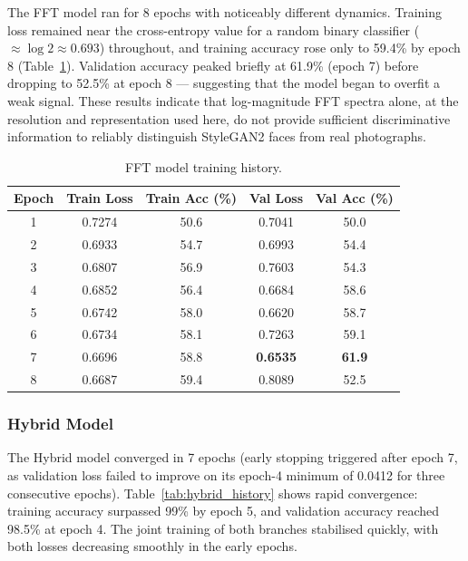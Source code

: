\documentclass[12pt, a4paper]{article}
\begin{document}
The FFT model ran for 8 epochs with noticeably different dynamics.  Training
loss remained near the cross-entropy value for a random binary classifier
($\approx \log 2 \approx 0.693$) throughout, and training accuracy rose only
to 59.4\% by epoch 8 (Table~\ref{tab:fft_history}).  Validation accuracy
peaked briefly at 61.9\% (epoch 7) before dropping to 52.5\% at epoch 8 —
suggesting that the model began to overfit a weak signal.  These results
indicate that log-magnitude FFT spectra alone, at the resolution and
representation used here, do not provide sufficient discriminative information
to reliably distinguish StyleGAN2 faces from real photographs.

\begin{table}[H]
\centering
\caption{FFT model training history.}
\label{tab:fft_history}
\begin{tabular}{ccccc}
\toprule
\textbf{Epoch} & \textbf{Train Loss} & \textbf{Train Acc (\%)} &
\textbf{Val Loss} & \textbf{Val Acc (\%)} \\
\midrule
1 & 0.7274 & 50.6 & 0.7041 & 50.0 \\
2 & 0.6933 & 54.7 & 0.6993 & 54.4 \\
3 & 0.6807 & 56.9 & 0.7603 & 54.3 \\
4 & 0.6852 & 56.4 & 0.6684 & 58.6 \\
5 & 0.6742 & 58.0 & 0.6620 & 58.7 \\
6 & 0.6734 & 58.1 & 0.7263 & 59.1 \\
7 & 0.6696 & 58.8 & \textbf{0.6535} & \textbf{61.9} \\
8 & 0.6687 & 59.4 & 0.8089 & 52.5 \\
\bottomrule
\end{tabular}
\end{table}

\subsubsection{Hybrid Model}

The Hybrid model converged in 7 epochs (early stopping triggered after epoch 7,
as validation loss failed to improve on its epoch-4 minimum of 0.0412 for
three consecutive epochs).  Table~\ref{tab:hybrid_history} shows rapid
convergence: training accuracy surpassed 99\% by epoch 5, and validation
accuracy reached 98.5\% at epoch 4.  The joint training of both branches
stabilised quickly, with both losses decreasing smoothly in the early epochs.
\end{document}
